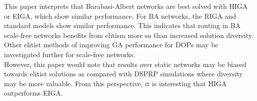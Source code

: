 \documentclass[
	a4paper, %
	10pt, %
	unnumberedsections, %
	twoside, %
]{LTJournalArticle}
\begin{document}
This paper interprets that Barabasi-Albert networks are best solved with HIGA or EIGA, which show similar performance. For BA networks, the RIGA and standard models show similar performance. This indicates that routing in BA scale-free networks benefits from elitism more so than increased solution diversity. Other elitist methods of improving GA performance for DOPs may be investigated further for scale-free networks. \\

However, this paper would note that results over static networks may be biased towards elitist solutions as compared with DSPRP simulations where diversity may be more valuable. From this perspective, it is interesting that HIGA outperforms EIGA. \\ 
\end{document}
